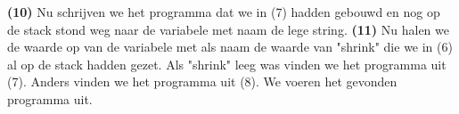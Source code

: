 \textbf{(10)} Nu schrijven we het programma dat we in (7) hadden gebouwd en nog op de stack stond weg naar de variabele met naam de lege string.
\textbf{(11)} Nu halen we de waarde op van de variabele met als naam de waarde van "shrink" die we in (6) al op de stack hadden gezet. Als "shrink" leeg was vinden we het programma uit (7). Anders vinden we het programma uit (8). We voeren het gevonden programma uit.












